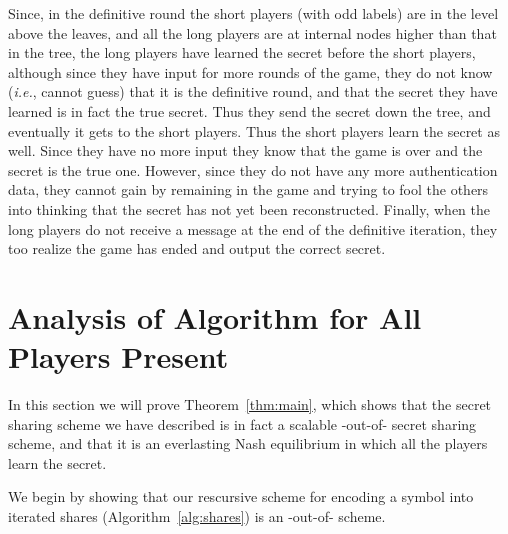 \documentclass[12pt]{article}
\theoremstyle{definition}
\newcommand{\ie}{\emph{i.e.}}
\begin{document}
Since, in the definitive round the short players 
(with odd labels) are in the level above the leaves, and all the long 
players are at internal nodes higher than that in the tree, the long players 
have learned the secret before the short players, although since they have
input for more rounds of the game, they do not know (\ie, cannot guess) that 
it is the definitive round, and that the secret they have learned is in 
fact the  true secret. Thus they send the secret down the tree, and 
eventually it gets to the short players. Thus the short players learn 
the secret as well. Since they have no more input they know that the 
game is over and the secret is the true one. However, since they do not 
have any more authentication data, they cannot gain by remaining in the 
game and trying to fool the others into thinking that the secret has not 
yet been reconstructed. Finally, when the long players do not receive a 
message at the end of the definitive iteration, they too realize the 
game has ended and output the correct secret. 


\section{Analysis of Algorithm for All Players Present}\label{sec:analysis}

In this section we will prove Theorem~\ref{thm:main}, which shows that the secret 
sharing scheme we have described is in fact a scalable -out-of- 
secret sharing scheme, and that it is an everlasting Nash equilibrium 
in which all the players learn the secret. 

We begin by showing that our rescursive scheme for encoding a symbol into  
iterated shares (Algorithm~\ref{alg:shares}) is an -out-of- scheme.
\end{document}
